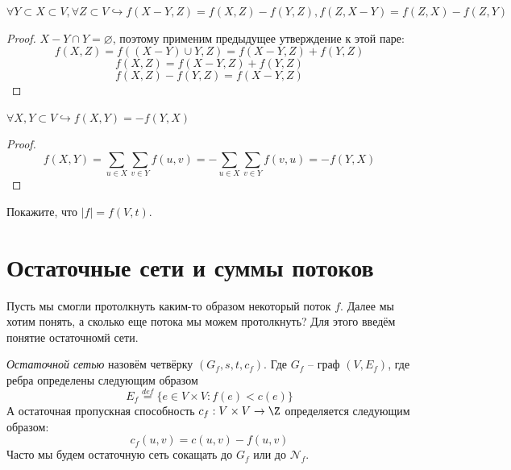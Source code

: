  $\forall Y \subset X \subset V, \forall Z \subset V \hookrightarrow f(X - Y, Z) = f(X, Z) - f(Y, Z), f(Z, X - Y) = f(Z, X) - f(Z, Y)$
\begin{proof}

    $X - Y \cap Y = \varnothing$, поэтому применим предыдущее утверждение к этой паре:
    \begin{equation*}
        f(X, Z) = f((X - Y) \cup Y, Z) = f(X - Y, Z) + f(Y, Z)
    \end{equation*}
    \begin{equation*}
        f(X, Z) = f(X - Y, Z) + f(Y, Z)
    \end{equation*}
    \begin{equation*}
        f(X, Z) - f(Y, Z) = f(X - Y, Z)
    \end{equation*}
\end{proof}

\St $\forall X, Y \subset V \hookrightarrow f(X, Y) = -f(Y, X)$
\begin{proof}
    \begin{equation*}
        f(X, Y) = \sum\limits_{u \in X} \sum\limits_{v \in Y} f(u, v) = - \sum\limits_{u \in X} \sum\limits_{v \in Y} f(v, u) = -f(Y, X)
    \end{equation*}
\end{proof}

\Exe Покажите, что $|f| = f(V, t)$.


\section{Остаточные сети и суммы потоков}

Пусть мы смогли протолкнуть каким-то образом некоторый поток $f$. Далее мы хотим понять, а сколько еще потока мы можем протолкнуть?
Для этого введём понятие остаточномй сети.

\Def \textit{Остаточной сетью} назовём четвёрку $(G_f, s, t, c_f)$. Где $G_f$ -- граф $(V, E_f)$, где ребра определены следующим образом
\begin{equation*}
    E_f \overset{def}{=} \{ e \in V \times V: f(e) < c(e) \}
\end{equation*}
А остаточная пропускная способность $c_f: V \times V \to \Z$ определяется следующим образом:
\begin{equation*}
    c_f(u, v) = c(u, v) - f(u, v)
\end{equation*}
Часто мы будем остаточную сеть сокащать до $G_f$ или до $\mathcal{N}_f$.

